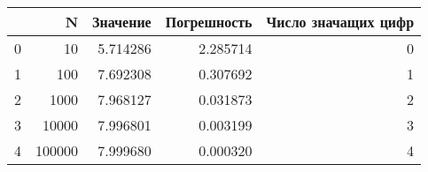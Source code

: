\begin{tabular}{lrrrr}
\toprule
 & N & Значение & Погрешность & Число значащих цифр \\
\midrule
0 & 10 & 5.714286 & 2.285714 & 0 \\
1 & 100 & 7.692308 & 0.307692 & 1 \\
2 & 1000 & 7.968127 & 0.031873 & 2 \\
3 & 10000 & 7.996801 & 0.003199 & 3 \\
4 & 100000 & 7.999680 & 0.000320 & 4 \\
\bottomrule
\end{tabular}
